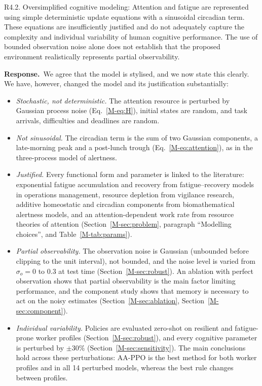 \documentclass[11pt]{article}
\newcommand{\resp}{\par\smallskip\noindent\textbf{Response.}~}
\newcommand{\Sec}[1]{Section~\ref{M-#1}}
\newcommand{\Eq}[1]{Eq.~\eqref{M-#1}}
\newcommand{\Tab}[1]{Table~\ref{M-#1}}
\begin{document}
\begin{rcomment}{R4.2.}
Oversimplified cognitive modeling: Attention and fatigue are represented using simple deterministic update equations with a sinusoidal circadian term. These equations are insufficiently justified and do not adequately capture the complexity and individual variability of human cognitive performance. The use of bounded observation noise alone does not establish that the proposed environment realistically represents partial observability.
\end{rcomment}
\resp We agree that the model is stylised, and we now state this clearly. We have, however, changed the model and its justification substantially:
\begin{itemize}
\item \emph{Stochastic, not deterministic.} The attention resource is perturbed by Gaussian process noise (\Eq{eq:H}), initial states are random, and task arrivals, difficulties and deadlines are random.
\item \emph{Not sinusoidal.} The circadian term is the sum of two Gaussian components, a late-morning peak and a post-lunch trough (\Eq{eq:attention}), as in the three-process model of alertness.
\item \emph{Justified.} Every functional form and parameter is linked to the literature: exponential fatigue accumulation and recovery from fatigue--recovery models in operations management, resource depletion from vigilance research, additive homeostatic and circadian components from biomathematical alertness models, and an attention-dependent work rate from resource theories of attention (\Sec{sec:problem}, paragraph ``Modelling choices'', and \Tab{tab:params}).
\item \emph{Partial observability.} The observation noise is Gaussian (unbounded before clipping to the unit interval), not bounded, and the noise level is varied from $\sigma_o=0$ to $0.3$ at test time (\Sec{sec:robust}). An ablation with perfect observation shows that partial observability is the main factor limiting performance, and the component study shows that memory is necessary to act on the noisy estimates (\Sec{sec:ablation}, \Sec{sec:component}).
\item \emph{Individual variability.} Policies are evaluated zero-shot on resilient and fatigue-prone worker profiles (\Sec{sec:robust}), and every cognitive parameter is perturbed by $\pm30\%$ (\Sec{sec:sensitivity}). The main conclusions hold across these perturbations: AA-PPO is the best method for both worker profiles and in all 14 perturbed models, whereas the best rule changes between profiles.
\end{itemize}
\end{document}
